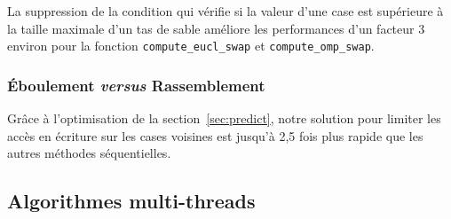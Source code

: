 La suppression de la condition qui vérifie si la valeur d'une case est
supérieure à la taille maximale d'un tas de sable améliore les
performances d'un facteur 3 environ pour la fonction
\texttt{compute\_eucl\_swap} et \texttt{compute\_omp\_swap}.

\subsubsection{Éboulement \textit{versus} Rassemblement}

Grâce à l'optimisation de la section~\ref{sec:predict}, notre solution
pour limiter les accès en écriture sur les cases voisines est jusqu'à
2,5 fois plus rapide que les autres méthodes séquentielles.

\subsection{Algorithmes multi-threads}
